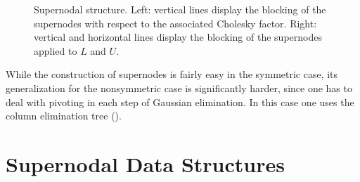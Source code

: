 \begin{figure}
\begin{minipage}{.48\textwidth}
\begin{center}
 \end{center}  
\end{minipage}
    \caption{Supernodal structure. Left: vertical lines display the blocking of the
supernodes with respect to the associated Cholesky factor. Right: 
vertical and horizontal lines display the blocking of the
supernodes applied to $L$ and $U$.}
    \label{fig:supernodal_structure}
\end{figure}

While the construction of supernodes is fairly easy in the symmetric case,
its generalization for the nonsymmetric case is significantly harder, since one
has to deal with pivoting in each step of Gaussian elimination.
In this case one uses the column elimination tree (\cite{GeoN85}).

\section{Supernodal Data Structures}
\label{sec:parallel}

